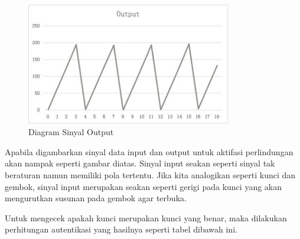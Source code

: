 \begin{figure}
	\centering
	\includegraphics[width=0.8\textwidth]
	{pics/dout.png}
	\caption{Diagram Sinyal Output}
	\label{Diagram Data Output}
\end{figure}

Apabila digambarkan sinyal data input dan output untuk aktifasi perlindungan akan nampak seperti gambar diatas. Sinyal input seakan seperti sinyal tak beraturan namun memiliki pola tertentu. Jika kita analogikan seperti kunci dan gembok, sinyal input merupakan seakan seperti gerigi pada kunci yang akan mengurutkan susunan pada gembok agar terbuka.

Untuk mengecek apakah kunci merupakan kunci yang benar, maka dilakukan perhitungan autentikasi yang hasilnya seperti tabel dibawah ini.

